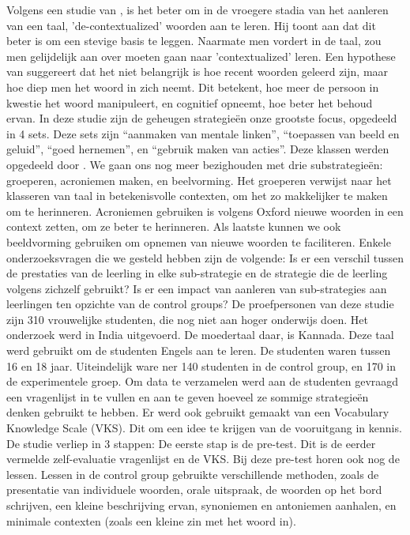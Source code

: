 \documentclass{voorstel}
\begin{document}
	Volgens een studie van \autocite{Nielson2006}, is het beter om in de vroegere stadia van het aanleren van een taal, 'de-contextualized' woorden aan te leren. Hij toont aan dat dit beter is om een stevige basis te leggen. Naarmate men vordert in de taal, zou men gelijdelijk aan over moeten gaan naar 'contextualized' leren. Een hypothese van \autocite{CraikTulving1975} suggereert dat het niet belangrijk is hoe recent woorden geleerd zijn, maar hoe diep men het woord in zich neemt. Dit betekent, hoe meer de persoon in kwestie het woord manipuleert, en cognitief opneemt, hoe beter het behoud ervan. In deze studie zijn de geheugen strategieën onze grootste focus, opgedeeld in 4 sets. Deze sets zijn ``aanmaken van mentale linken'', ``toepassen van beeld en geluid'', ``goed hernemen'', en ``gebruik maken van acties''. Deze klassen werden opgedeeld door \autocite{Oxford1990}. We gaan ons nog meer bezighouden met drie substrategieën: groeperen, acroniemen maken, en beelvorming. Het groeperen verwijst naar het klasseren van taal in betekenisvolle contexten, om het zo makkelijker te maken om te herinneren. Acroniemen gebruiken is volgens Oxford nieuwe woorden in een context zetten, om ze beter te herinneren. Als laatste kunnen we ook beeldvorming gebruiken om opnemen van nieuwe woorden te faciliteren.
	Enkele onderzoeksvragen die we gesteld hebben zijn de volgende:
	Is er een verschil tussen de prestaties van de leerling in elke sub-strategie en de strategie die de leerling volgens zichzelf gebruikt?
	Is er een impact van aanleren van sub-strategies aan leerlingen ten opzichte van de control groups?
	De proefpersonen van deze studie zijn 310 vrouwelijke studenten, die nog niet aan hoger onderwijs doen. Het onderzoek werd in India uitgevoerd. De moedertaal daar, is Kannada. Deze taal werd gebruikt om de studenten Engels aan te leren. De studenten waren tussen 16 en 18 jaar. Uiteindelijk ware ner 140 studenten in de control group, en 170 in de experimentele groep.
	Om data te verzamelen werd aan de studenten gevraagd een vragenlijst in te vullen en aan te geven hoeveel ze sommige strategieën denken gebruikt te hebben.
	Er werd ook gebruikt gemaakt van een Vocabulary Knowledge Scale (VKS). Dit om een idee te krijgen van de vooruitgang in kennis.
	De studie verliep in 3 stappen: De eerste stap is de pre-test. 
	Dit is de eerder vermelde zelf-evaluatie vragenlijst en de VKS. 
	Bij deze pre-test horen ook nog de lessen.
	Lessen in de control group gebruikte verschillende methoden, zoals de presentatie van individuele woorden, orale uitspraak, de woorden op het bord schrijven, een kleine beschrijving ervan, synoniemen en antoniemen aanhalen, en minimale contexten (zoals een kleine zin met het woord in).
\end{document}
